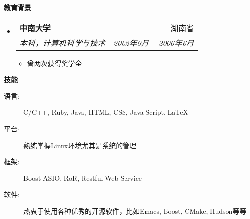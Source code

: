 \documentclass[letterpaper,11pt]{article}
\makeatletter
\newcommand{\resitem}[1]{\item #1 \vspace{-2pt}}
\newcommand{\resheading}[1]{{\large \colorbox{mygrey}{\begin{minipage}{\textwidth}{\textbf{#1 \vphantom{p\^{E}}}}\end{minipage}}}}
\newcommand{\ressubheading}[4]{
\begin{tabular*}{6.5in}{l@{\extracolsep{\fill}}r}
		\textbf{#1} & #2 \\
		\textit{#3} & \textit{#4} \\
\end{tabular*}\vspace{-6pt}}
\makeatother
\begin{document}
\resheading{教育背景}
\begin{itemize}
\item \ressubheading{中南大学}{湖南省}{%
    本科，计算机科学与技术}{2002年9月 -- 2006年6月}

  { \footnotesize
    \begin{itemize}
      \resitem{曾两次获得奖学金}
    \end{itemize}
  }

\end{itemize} %

\resheading{技能}
	\begin{description}
		\item[语言:] { \footnotesize C/C++, Ruby, Java, HTML, CSS, Java Script, \LaTeX } 
		\item[平台:] { \footnotesize 熟练掌握Linux环境尤其是系统的管理 }
        \item[框架:] { \footnotesize Boost ASIO, RoR, Restful Web Service}
		\item[软件:] { \footnotesize 热衷于使用各种优秀的开源软件，比如Emacs,
          Boost, CMake, Hudson等等 }
	\end{description} %
\end{document}
